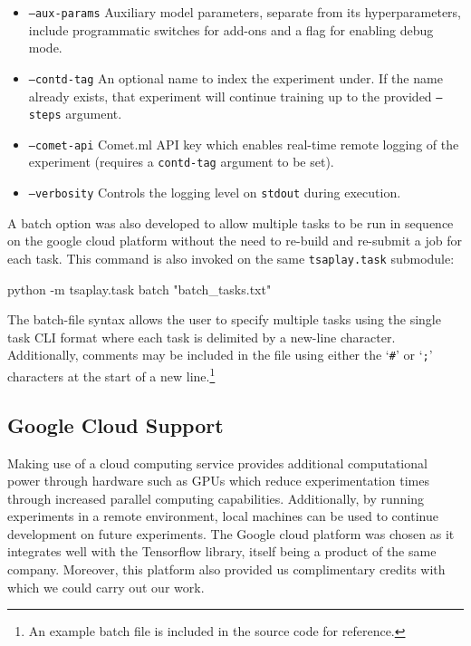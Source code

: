 \documentclass[../../fyp.tex]{subfiles}
\begin{document}
\begin{itemize}
\item \texttt{--aux-params} Auxiliary model parameters, separate from its hyperparameters, include programmatic switches for add-ons and a flag for enabling debug mode.
\item \texttt{--contd-tag} An optional name to index the experiment under. If the name already exists, that experiment will continue training up to the provided \texttt{--steps} argument.
\item \texttt{--comet-api} Comet.ml API key which enables real-time remote logging of the experiment (requires a \texttt{contd-tag} argument to be set). 
\item \texttt{--verbosity} Controls the logging level on \texttt{stdout} during execution.  
\end{itemize}
\clearpage
A batch option was also developed to allow multiple tasks to be run in sequence on the google cloud platform without the need to re-build and re-submit a job for each task. This command is also invoked on the same \texttt{tsaplay.task} submodule: 
\begin{code}
	python -m tsaplay.task batch "batch_tasks.txt"
\end{code}

The batch-file syntax allows the user to specify multiple tasks using the single task CLI format where each task is delimited by a new-line character. Additionally, comments may be included in the file using either the \enquote*{\texttt{\#}} or \enquote*{\texttt{;}} characters at the start of a new line.\footnote{An example batch file is included in the source code for reference.}

\subsection{Google Cloud Support}
Making use of a cloud computing service provides additional computational power through hardware such as GPUs which reduce experimentation times through increased parallel computing capabilities. Additionally, by running experiments in a remote environment, local machines can be used to continue development on future experiments. The Google cloud platform was chosen as it integrates well with the Tensorflow library, itself being a product of the same company. Moreover, this platform also provided us complimentary credits with which we could carry out our work. 
\end{document}
